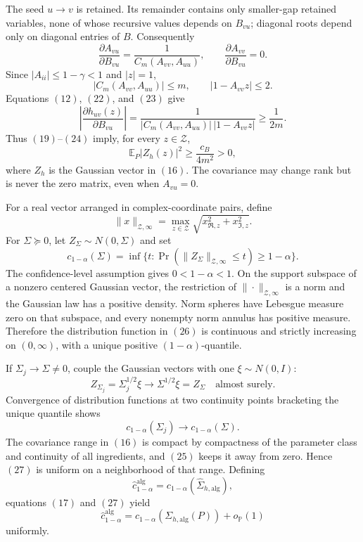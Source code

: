 The seed \(u\to v\) is retained.  Its remainder contains only smaller-gap retained variables, none of whose recursive values depends on \(B_{vu}\); diagonal roots depend only on diagonal entries of \(B\).  Consequently
\[
 \frac{\partial A_{vu}}{\partial B_{vu}}
 =\frac{1}{C_m(A_{vv},A_{uu})},
 \qquad
 \frac{\partial A_{vv}}{\partial B_{vu}}=0.
\tag{22}
\]
Since \(|A_{ii}|\le1-\gamma<1\) and \(|z|=1\),
\[
 |C_m(A_{vv},A_{uu})|\le m,
 \qquad
 |1-A_{vv}z|\le2.
\tag{23}
\]
Equations \((12)\), \((22)\), and \((23)\) give
\[
 \left|\frac{\partial h_{uv}(z)}{\partial B_{vu}}\right|
 =\frac{1}{|C_m(A_{vv},A_{uu})|\,|1-A_{vv}z|}
 \ge\frac1{2m}.
\tag{24}
\]
Thus \((19)\)--\((24)\) imply, for every \(z\in\mathcal Z\),
\[
 \mathbb E_P|Z_h(z)|^2\ge\frac{c_B}{4m^2}>0,
\tag{25}
\]
where \(Z_h\) is the Gaussian vector in \((16)\).  The covariance may change rank but is never the zero matrix, even when \(A_{vu}=0\).

For a real vector arranged in complex-coordinate pairs, define
\[
 \|x\|_{\mathcal Z,\infty}
 =\max_{z\in\mathcal Z}\sqrt{x_{\Re,z}^2+x_{\Im,z}^2}.
\]
For \(\Sigma\succeq0\), let \(Z_\Sigma\sim N(0,\Sigma)\) and set
\[
 c_{1-\alpha}(\Sigma)
 =\inf\{t:\Pr(\|Z_\Sigma\|_{\mathcal Z,\infty}\le t)\ge1-\alpha\}.
\tag{26}
\]
The confidence-level assumption gives \(0<1-\alpha<1\).  On the support subspace of a nonzero centered Gaussian vector, the restriction of \(\|\cdot\|_{\mathcal Z,\infty}\) is a norm and the Gaussian law has a positive density.  Norm spheres have Lebesgue measure zero on that subspace, and every nonempty norm annulus has positive measure.  Therefore the distribution function in \((26)\) is continuous and strictly increasing on \((0,\infty)\), with a unique positive \((1-\alpha)\)-quantile.

If \(\Sigma_j\to\Sigma\ne0\), couple the Gaussian vectors with one \(\xi\sim N(0,I)\):
\[
 Z_{\Sigma_j}=\Sigma_j^{1/2}\xi
 \longrightarrow \Sigma^{1/2}\xi=Z_\Sigma
 \quad\text{almost surely}.
\]
Convergence of distribution functions at two continuity points bracketing the unique quantile shows
\[
 c_{1-\alpha}(\Sigma_j)\longrightarrow c_{1-\alpha}(\Sigma).
\tag{27}
\]
The covariance range in \((16)\) is compact by compactness of the parameter class and continuity of all ingredients, and \((25)\) keeps it away from zero.  Hence \((27)\) is uniform on a neighborhood of that range.  Defining
\[
 \widehat c_{1-\alpha}^{\mathrm{alg}}
 =c_{1-\alpha}(\widehat\Sigma_{h,\mathrm{alg}}),
\]
equations \((17)\) and \((27)\) yield
\[
 \widehat c_{1-\alpha}^{\mathrm{alg}}
 =c_{1-\alpha}(\Sigma_{h,\mathrm{alg}}(P))+o_{\mathbb P}(1)
\tag{28}
\]
uniformly.

